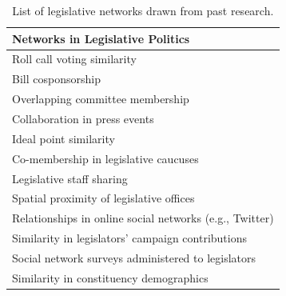 \documentclass[12pt]{article}
\begin{document}
\begin{table}[h]
\centering
\begin{tabular}{l}
\hline \hline
 Networks in Legislative Politics\\
\hline
Roll call voting similarity\\
Bill cosponsorship\\
Overlapping committee membership\\
Collaboration in press events\\
Ideal point similarity \\
Co-membership in legislative caucuses\\
Legislative staff sharing \\
Spatial proximity of legislative offices \\
Relationships in online social networks (e.g., Twitter) \\
Similarity in legislators' campaign contributions \\
Social network surveys administered to legislators \\
Similarity in constituency demographics \\
\hline \hline
\end{tabular}

\caption{List of legislative networks drawn from past research.}
\label{tab:legislative.nets}
\end{table}
\end{document}
